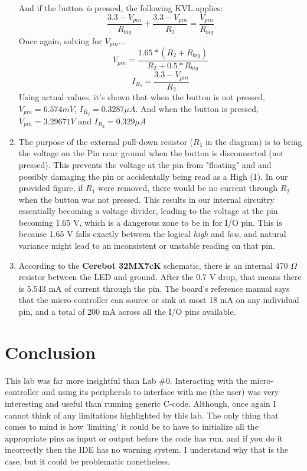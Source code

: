 \documentclass[a4paper, 12pt]{article}
\begin{document}
\begin{enumerate}
And if the button \textit{is} pressed, the following KVL applies:
$$\frac{3.3-V_{pin}}{R_{big}}+\frac{3.3-V_{pin}}{R_2}=\frac{V_{pin}}{R_{big}}$$
Once again, solving for \textit{$V_{pin}$}...
\begin{equation}V_{pin}=\frac{1.65*(R_2+R_{big})}{R_2+0.5*R_{big}}\end{equation}
\begin{equation}I_{R_2}=\frac{3.3-V_{pin}}{R_2}\end{equation}
Using actual values, it's shown that when the button is not pressed, $V_{pin}=6.574 mV$, $I_{R_2}=0.3287 \mu A$. And when the button is pressed, $V_{pin}=3.29671 V$ and $I_{R_2}=0.329 \mu A$

\item The purpose of the external pull-down resistor ($R_1$ in the diagram) is to bring the voltage on the Pin near ground when the button is disconnected (not pressed). This prevents the voltage at the pin from "floating" and and possibly damaging the pin or accidentally being read as a High (1). In our provided figure, if $R_1$ were removed, there would be no current through $R_2$ when the button was not pressed. This results in our internal circuitry essentially becoming a voltage divider, leading to the voltage at the pin becoming 1.65 V, which is a dangerous zone to be in for I/O pin. This is because 1.65 V falls exactly between the logical \textit{high} and \textit{low}, and natural variance might lead to an inconsistent or unstable reading on that pin.

\item According to the \textbf{Cerebot 32MX7cK} schematic, there is an internal 470 $\Omega$ resistor between the LED and ground. After the 0.7 V drop, that means there is 5.543 mA of current through the pin. The board's reference manual says that the micro-controller can source or sink at most 18 mA on any individual pin, and a total of 200 mA across all the I/O pins available.
\end{enumerate}

\section{Conclusion}
This lab was far more insightful than Lab \#0. Interacting with the micro-controller and using its peripherals to interface with me (the user) was very interesting and useful than running generic C-code. Although, once again I cannot think of any limitations highlighted by this lab. The only thing that comes to mind is how 'limiting' it could be to have to initialize all the appropriate pins as input or output before the code has run, and if you do it incorrectly then the IDE has no warning system. I understand why that is the case, but it could be problematic nonetheless.
\end{document}
